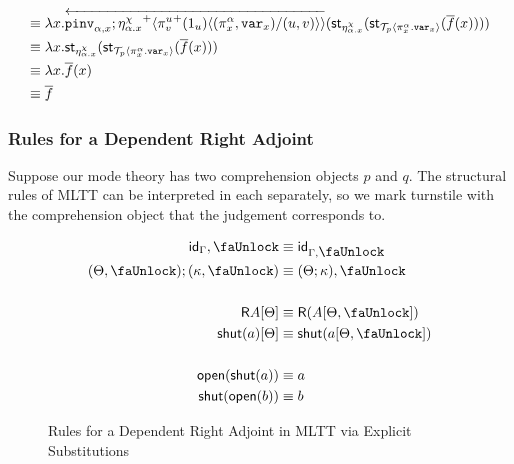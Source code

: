 \documentclass[10pt]{article}
\theoremstyle{definition}
\newcommand{\CTX}{\,\,\mathsf{Ctx}}
\newcommand{\TYPE}{\,\,\mathsf{Type}}
\newcommand{\id}{\mathsf{id}}
\newcommand{\rewrite}[2]{\overleftarrow{#1}(#2)}
\newcommand\UI[2]{\ensuremath{\lambda #1.#2}}
\newcommand\StI[2]{\ensuremath{\mathsf{st}_{#1}(#2)}}
\newcommand\TrPlus[2]{\ensuremath{{#1}^+(#2)}}
\newcommand\ApEl[2]{\mathcal{T}_{#1}\langle#2\rangle}
\newcommand\bdot[0]{\mathbin{.}}
\newcommand\ap[2]{\ensuremath{#1 \langle #2 \rangle }}
\newcommand\ApPlus[2]{\ensuremath{{#1}^+ \langle #2 \rangle }}
\begin{document}
\begin{enumerate}[style = multiline, labelwidth = 80pt]
\begin{align*}
\equiv{} &\UI{x}{\rewrite{\pinv{\alpha,x};\ApPlus{\eta^\chi_{\alpha.x}}{\ap{\TrPlus{\pi^u_v}{1_u}}{(\pi^\alpha_x,\var{x})/(u,v)}}}{\StI{\eta^\chi_{\alpha.x}}{\StI{\ApEl{p}{\pi^\alpha_x \bdot \var{x}}}{\upstairs{f}(x)}}}} \\
\equiv{} &\UI{x}{\StI{\eta^\chi_{\alpha.x}}{\StI{\ApEl{p}{\pi^\alpha_x \bdot \var{x}}}{\upstairs{f}(x)}}} \\
\equiv{} &\UI{x}{\upstairs{f}(x)} \\
\equiv{} &\upstairs{f}
\end{align*}
\end{enumerate}

\subsubsection{Rules for a Dependent Right Adjoint}
\newcommand{\lock}{\mbox{\faUnlock}}
\newcommand{\Rtype}[1]{\mathsf{R}{#1}}
\newcommand{\RI}[1]{\mathsf{shut}({#1})}
\newcommand{\RE}[1]{\mathsf{open}({#1})}

Suppose our mode theory has two comprehension objects $p$ and $q$. The structural rules of MLTT can be interpreted in each separately, so we mark turnstile with the comprehension object that the judgement corresponds to.

\begin{figure}
\begin{align}
\id_\Gamma , \lock &\equiv \id_{\Gamma, \lock} \\
(\Theta, \lock) ; (\kappa, \lock) &\equiv (\Theta ; \kappa), \lock \\
\nonumber \\
\Rtype{A}[\Theta] &\equiv \Rtype{(A[\Theta, \lock])} \\
\RI{a}[\Theta] &\equiv \RI{a[\Theta, \lock]} \\
\nonumber \\
\RE{\RI{a}} &\equiv a \\
\RI{\RE{b}} &\equiv b
\end{align}
\begin{mathpar}

\end{mathpar}
\caption{Rules for a Dependent Right Adjoint in MLTT via Explicit Substitutions}\label{fig:qit-pi-rules}
\end{figure}
\end{document}
